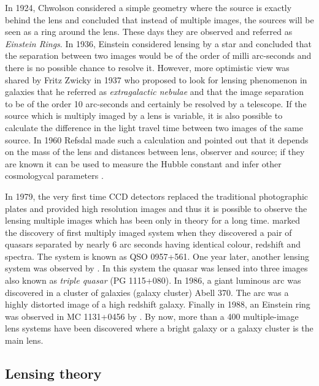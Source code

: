 In 1924, Chwolson
considered a simple geometry where the source is exactly behind the lens
and concluded that instead of multiple images, the sources will be seen
as a ring around the lens. These days they are observed and referred as {\it Einstein Rings}.
In 1936, Einstein
considered lensing by a star and concluded that the separation between two images
would be of the order of milli arc-seconds and there is no possible chance to
resolve it. However, more optimistic view was shared by Fritz Zwicky in 1937 who
proposed to look for lensing phenomenon in galaxies that he referred as 
{\it extragalactic nebulae} and that the image separation to be of the order 10 arc-seconds
and certainly be resolved by a telescope. If the source which is multiply imaged
by a lens is variable, it is also possible to calculate the difference 
in the light travel time between two images of the same source. In 1960 Refsdal
made such a calculation and pointed out that it depends on the mass of the lens
and distances between lens, observer and source; if they are known it can be 
used to measure the Hubble constant and infer other cosmologycal parameters
\cite{2004tomu.conf..231R}. 



In 1979, the very first time CCD detectors replaced the traditional photographic
plates and provided high resolution 
images and thus it is possible to observe the lensing multiple images
which has been only in theory for a long time. \cite{1979Natur.279..381W} marked
the discovery of first multiply imaged system when they discovered a pair of quasars
separated by nearly 6 arc seconds having identical colour, redshift and spectra. The
system is known as QSO 0957+561. One year later, another lensing system was observed
by \cite{1980Natur.285..641W}. In this system the quasar was lensed into three
images also known as {\it triple quasar} (PG 1115+080). In 1986, a giant luminous
arc was discovered in a cluster of galaxies (galaxy cluster) Abell 370. The arc
was a highly distorted image of a high redshift galaxy. Finally in 1988, an Einstein
ring was observed in MC 1131+0456 by \cite{1988Natur.333..537H}. By now, more than 
a 400 multiple-image lens systems have been discovered where a bright galaxy
or a galaxy cluster is the main lens. 





\subsection{Lensing theory}

